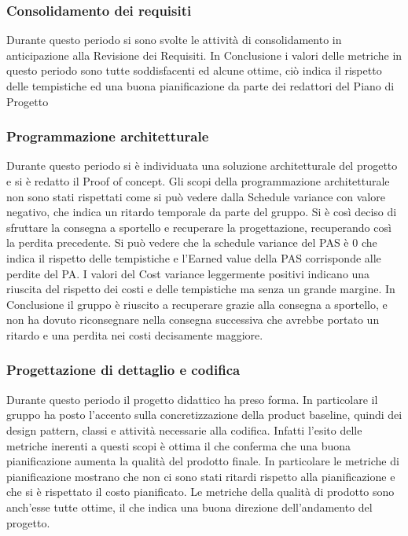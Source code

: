 \subsubsection{Consolidamento dei requisiti}
Durante questo periodo si sono svolte le attività di consolidamento in anticipazione alla Revisione dei Requisiti.
In Conclusione i valori delle metriche in questo periodo sono tutte soddisfacenti ed alcune ottime, ciò indica il rispetto delle tempistiche ed una buona pianificazione da parte dei redattori del Piano di Progetto

\subsubsection{Programmazione architetturale}
Durante questo periodo si è individuata una soluzione architetturale del progetto e si è redatto il Proof of concept.
Gli scopi della programmazione architetturale non sono stati rispettati come si può vedere dalla Schedule variance con valore negativo, che indica un ritardo temporale da parte del gruppo.
Si è così deciso di sfruttare la consegna a sportello e recuperare la progettazione, recuperando così la perdita precedente. Si può vedere che la schedule variance del PAS è 0 che indica il rispetto delle tempistiche e l'Earned value della PAS corrisponde alle perdite del PA.
I valori del Cost variance leggermente positivi indicano una riuscita del rispetto dei costi e delle tempistiche ma senza un grande margine.
In Conclusione il gruppo è riuscito a recuperare grazie alla consegna a sportello, e non ha dovuto riconsegnare nella consegna successiva che avrebbe portato un ritardo e una perdita nei costi decisamente maggiore.

\newpage
\subsubsection{Progettazione di dettaglio e codifica}

Durante questo periodo il progetto didattico ha preso forma. In particolare il gruppo ha posto l'accento sulla concretizzazione della product baseline, quindi dei design pattern, classi e attività necessarie alla codifica.
Infatti l'esito delle metriche inerenti a questi scopi è ottima il che conferma che una buona pianificazione aumenta la qualità del prodotto finale.
In particolare le metriche di pianificazione mostrano che non ci sono stati ritardi rispetto alla pianificazione e che si è rispettato il costo pianificato.
Le metriche della qualità di prodotto sono anch'esse tutte ottime, il che indica una buona direzione dell'andamento del progetto.

